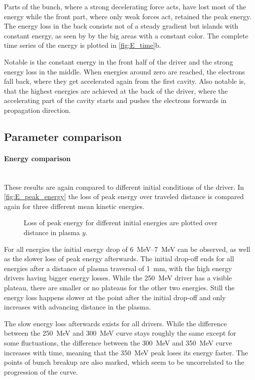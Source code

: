 \documentclass[bachelor_thesis]{subfiles}
\begin{document}
Parts of the bunch, where a strong decelerating force acts, have lost most of the energy while the front part, where only weak forces act, retained the peak energy. The energy loss in the back consists not of a steady gradient but islands with constant energy, as seen by by the big areas with a constant color.
The complete time series of the energy is plotted in \autoref{fig:E_time}b.

Notable is the constant energy in the front half of the driver and the strong energy loss in the middle. When energies around zero are reached, the electrons fall back, where they get accelerated again from the first cavity.
Also notable is, that the highest energies are achieved at the back of the driver, where the accelerating part of the cavity starts and pushes the electrons forwards in propagation direction.

\subsection{Parameter comparison}
\paragraph*{Energy comparison}\hspace{0pt} \\
These results are again compared to different initial conditions of the driver. In \autoref{fig:E_peak_energy} the loss of peak energy over traveled distance is compared again for three different mean kinetic energies.
\begin{figure}
	\centering
	
	\caption{Loss of peak energy for different initial energies are plotted over distance in plasma $y$.}
	\label{fig:E_peak_energy}
\end{figure}

For all energies the initial energy drop of \qtyrange{6}{7}{\MeV} can be observed, as well as the slower loss of peak energy afterwards. The initial drop-off ends for all energies after a distance of plasma traversal of \qty{1}{\mm}, with the high energy drivers having bigger energy losses. 
While the \qty{250}{\MeV} driver has a visible plateau, there are smaller or no plateaus for the other two energies. Still the energy loss happens slower at the point after the initial drop-off and only increases with advancing distance in the plasma.

The slow energy loss afterwards exists for all drivers. While the difference between the \qty{250}{\MeV} and \qty{300}{\MeV} curve stays roughly the same except for some fluctuations, 
the difference between the \qty{300}{\MeV} and \qty{350}{\MeV} curve increases with time, meaning that the \qty{350}{\MeV} peak loses its energy faster. The points of bunch breakup are also marked, which seem to be uncorrelated to the progression of the curve.
\end{document}
